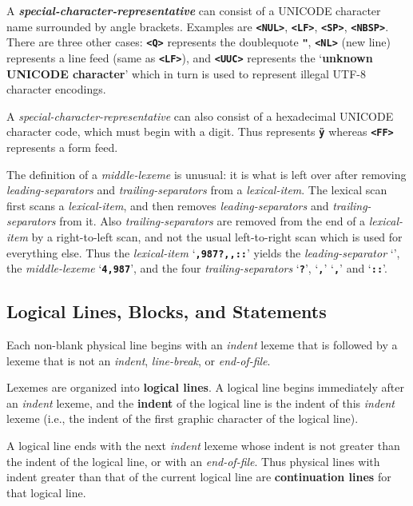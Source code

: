 \documentclass[12pt]{article}
\newcommand{\TT}[1]{{\tt \bfseries #1}}
\newcommand{\key}[1]{{\rm \bfseries #1}}
\newcommand{\emkey}[1]{{\em \bfseries #1}}
\newcommand{\skey}[2]{{\rm \bfseries #1#2}}
\newcommand{\tttkey}[1]{{\tt \bfseries <#1>}}
\begin{document}
A \emkey{special-character-representative} can consist of
a UNICODE character name surrounded by angle brackets.  Examples are
\TT{<NUL>}, \TT{<LF>}, \TT{<SP>}, \TT{<NBSP>}.  There are three other cases:
\tttkey{Q} represents the doublequote \TT{"}, \tttkey{NL} (new line)
represents a line feed (same as \TT{<LF>}), and \tttkey{UUC} represents
the `\key{unknown UNICODE character}' which in turn is used to represent
illegal UTF-8 character encodings.

A {\em special-character-representative} can also consist of
a hexadecimal UNICODE character code, which must begin with a digit.
Thus \TT{<0FF>} represents \TT{\"y} whereas \TT{<FF>} represents
a form feed.

The definition of a {\em middle-lexeme} is unusual: it is what is left over
after removing {\em leading-separators} and {\em trailing-separators}
from a {\em lexical-item}.  The lexical scan first scans a
{\em lexical-item}, and then removes
{\em leading-separators} and {\em trailing-separators} from it.
Also {\em trailing-separators} are removed
from the end of a {\em lexical-item} by a right-to-left scan, and not
the usual left-to-right scan which is used for everything else.
Thus the {\em lexical-item}
`\TT{,987?,{},::}' yields the
{\em leading-separator} `\TT{\textquestiondown}',
the {\em middle-lexeme} `\TT{4,987}',
and the four {\em trailing-separators} `\TT{?}',
`\TT{,}' `\TT{,}' and `\TT{::}'.

\subsection{Logical Lines, Blocks, and Statements}
\label{LOGICAL-LINES-BLOCKS-AND-STATEMENTS}

Each non-blank physical line begins with an {\em indent} lexeme
that is followed by a
lexeme that is not an {\em indent}, {\em line-break}, or
{\em end-of-file}.

Lexemes are organized into \skey{logical line}s.  A logical line
begins immediately after an {\em indent} lexeme, and the
\key{indent} of the logical line is the
indent of this {\em indent} lexeme (i.e., the indent of the
first graphic character of the logical line).

A logical line ends with the next {\em indent} lexeme whose indent
is not greater than the indent of the logical line, or with an
{\em end-of-file}.  Thus physical
lines with indent greater than that of the current logical line
are \skey{continuation line}s for that logical line.
\end{document}
